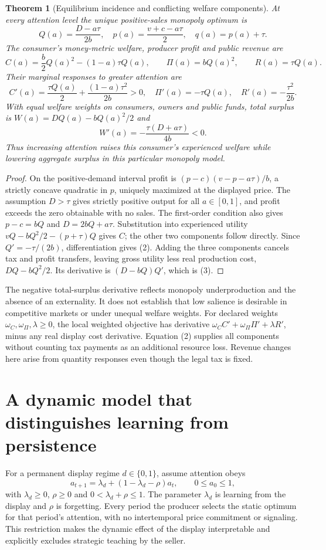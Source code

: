 \documentclass[11pt]{article}
\newtheorem{theorem}{Theorem}
\theoremstyle{remark}\newtheorem{remark}[theorem]{Remark}
\begin{document}
\begin{theorem}[Equilibrium incidence and conflicting welfare components]
At every attention level the unique positive-sales monopoly optimum is
\[
 Q(a)=\frac{D-a\tau}{2b},\quad p(a)=\frac{v+c-a\tau}{2},\quad q(a)=p(a)+\tau.
\]
The consumer's money-metric welfare, producer profit and public revenue are
\[
 C(a)=\frac b2Q(a)^2-(1-a)\tau Q(a),\qquad
 \Pi(a)=bQ(a)^2,\qquad R(a)=\tau Q(a).
\]
Their marginal responses to greater attention are
\[
 C'(a)=\frac{\tau Q(a)}2+\frac{(1-a)\tau^2}{2b}>0,\quad
 \Pi'(a)=-\tau Q(a),\quad R'(a)=-\frac{\tau^2}{2b}.
 \tag{2}
\]
With equal welfare weights on consumers, owners and public funds, total surplus is $W(a)=DQ(a)-bQ(a)^2/2$ and
\[
 W'(a)=-\frac{\tau(D+a\tau)}{4b}<0.
 \tag{3}
\]
Thus increasing attention raises this consumer's experienced welfare while lowering aggregate surplus in this particular monopoly model.
\end{theorem}
\begin{proof}
On the positive-demand interval profit is $(p-c)(v-p-a\tau)/b$, a strictly concave quadratic in $p$, uniquely maximized at the displayed price. The assumption $D>\tau$ gives strictly positive output for all $a\in[0,1]$, and profit exceeds the zero obtainable with no sales. The first-order condition also gives $p-c=bQ$ and $D=2bQ+a\tau$. Substitution into experienced utility $vQ-bQ^2/2-(p+\tau)Q$ gives $C$; the other two components follow directly. Since $Q'=-\tau/(2b)$, differentiation gives (2). Adding the three components cancels tax and profit transfers, leaving gross utility less real production cost, $DQ-bQ^2/2$. Its derivative is $(D-bQ)Q'$, which is (3).
\end{proof}

The negative total-surplus derivative reflects monopoly underproduction and the absence of an externality. It does not establish that low salience is desirable in competitive markets or under unequal welfare weights. For declared weights $\omega_C,\omega_\Pi,\lambda\ge0$, the local weighted objective has derivative $\omega_C C'+\omega_\Pi\Pi'+\lambda R'$, minus any real display cost derivative. Equation (2) supplies all components without counting tax payments as an additional resource loss. Revenue changes here arise from quantity responses even though the legal tax is fixed.

\section*{A dynamic model that distinguishes learning from persistence}
For a permanent display regime $d\in\{0,1\}$, assume attention obeys
\[
 a_{t+1}=\lambda_d+(1-\lambda_d-\rho)a_t,\qquad 0\le a_0\le1,
 \tag{4}
\]
with $\lambda_d\ge0$, $\rho\ge0$ and $0<\lambda_d+\rho\le1$. The parameter $\lambda_d$ is learning from the display and $\rho$ is forgetting. Every period the producer selects the static optimum for that period's attention, with no intertemporal price commitment or signaling. This restriction makes the dynamic effect of the display interpretable and explicitly excludes strategic teaching by the seller.
\end{document}
